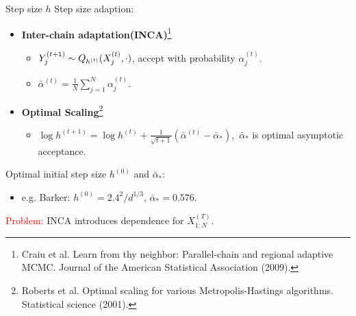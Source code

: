 \documentclass[10pt,xcolor=table]{beamer}
\begin{document}
\begin{frame}{Step size $h$}
Step size adaption: 
            \begin{itemize}
                \item \textbf{Inter-chain adaptation(INCA)}\footnote{Craiu et al. Learn from thy neighbor: Parallel-chain and regional adaptive MCMC. Journal of the American Statistical Association (2009).}
                \begin{itemize}
                	\item $Y_{j}^{(t+1)} \sim Q_{h^{(t)}}(X_{j}^{(t)}, \cdot)$, accept with probability $\alpha^{(t)}_{j}$. 
                	\item $\bar\alpha^{(t)} = \frac{1}{N} \sum_{j=1}^{N} \alpha^{(t)}_{j}$.
                \end{itemize}
				\item \textbf{Optimal Scaling}\footnote{Roberts et al. Optimal scaling for various Metropolis-Hastings algorithms. Statistical science (2001).}
				
				\begin{itemize}
					\item  $
					\label{eq:adaptive step size}
					\log h^{(t+1)}= \log h^{(t)} +  \frac{1}{\sqrt{t+1}}(\bar\alpha^{(t)} - \bar{\alpha}_{*}),$
					$\bar{\alpha}_{*}$ is optimal asymptotic acceptance. 
				\end{itemize}
            \end{itemize} \pause
Optimal initial step size $h^{(0)}$ and $\bar{\alpha}_{*}$:
        \begin{itemize}
            \item e.g. Barker: $h^{(0)} = {2.4^2}/{d^{1/3}}$, $\bar{\alpha}_{*} = 0.576$.
        \end{itemize} \pause 
\textcolor{red}{Problem:} INCA introduces dependence for $X_{1:N}^{(T)}$. 
\end{frame}
\end{document}
